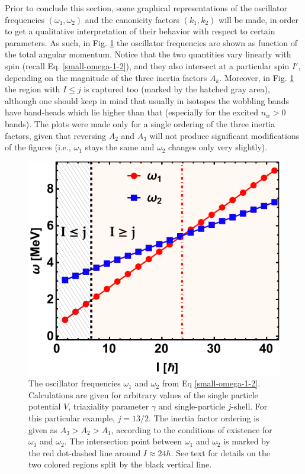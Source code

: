 Prior to conclude this section, some graphical representations of the oscillator frequencies $(\omega_1,\omega_2)$ and the canonicity factors $(k_1,k_2)$ will be made, in order to get a qualitative interpretation of their behavior with respect to certain parameters. As such, in Fig. \ref{fig-omega1-omega2} the oscillator frequencies are shown as function of the total angular momentum. Notice that the two quantities vary linearly with spin (recall Eq. \ref{small-omega-1-2}), and they also intersect at a particular spin $I'$, depending on the magnitude of the three inertia factors $A_k$. Moreover, in Fig. \ref{fig-omega1-omega2} the region with $I\leq j$ is captured too (marked by the hatched gray area), although one should keep in mind that usually in isotopes the wobbling bands have band-heads which lie higher than that (especially for the excited $n_w>0$ bands). The plots were made only for a single ordering of the three inertia factors, given that reversing $A_2$ and $A_3$ will not produce significant modifications of the figures (i.e., $\omega_1$ stays the same and $\omega_2$ changes only very slightly).
\begin{figure}
    \centering
    \includegraphics[scale=0.8]{Chapters/Figures/omega-1-2-frequencies-1.pdf}
    \caption{The oscillator frequencies $\omega_1$ and $\omega_2$ from Eq \ref{small-omega-1-2}. Calculations are given for arbitrary values of the single particle potential $V$, triaxiality parameter $\gamma$ and single-particle $j$-shell. For this particular example, $j=13/2$. The inertia factor ordering is given as $A_3>A_2>A_1$, according to the conditions of existence for $\omega_1$ and $\omega_2$. The intersection point between $\omega_1$ and $\omega_2$ is marked by the red dot-dashed line around $I\approx 24\hbar$. See text for details on the two colored regions split by the black vertical line.}
    \label{fig-omega1-omega2}
\end{figure}

